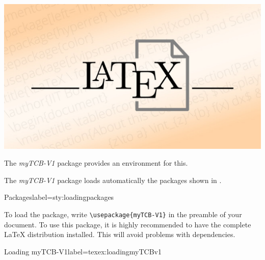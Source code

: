 \documentclass[]{myHOWTO-V001}
\begin{document}
\begin{myBOX}{}

\setlength{\parskip}{3mm}

\lipsum[4]

\qquad
\begin{myFIG}{}
	\includegraphics[scale=0.15]{LaTeX.jpg}
\end{myFIG}

\lipsum[1]

\end{myBOX}

The \emph{myTCB-V1} package provides an environment for this.

\newpage

The \emph{myTCB-V1} package loads automatically the packages shown in .

\begin{mySTYdoclst}{Packages}{label={sty:loadingpackages}}
\RequirePackage{lipsum}

\RequirePackage{graphicx}
\RequirePackage{wrapfig}

\RequirePackage{xcolor}

\RequirePackage{verbatim}
\RequirePackage{fancyvrb}
\RequirePackage{listings}

\RequirePackage{float}

\RequirePackage{refstyle}

\RequirePackage{tcolorbox}
\end{mySTYdoclst}

To load the package, write \Verb|\usepackage{myTCB-V1}| in the preamble of your document. To use this package, it is highly recommended to have the complete \LaTeX{} distribution installed. This will avoid problems with dependencies.

\begin{myTEXEXdoclst}{Loading myTCB-V1}{label={texex:loadingmyTCBv1}}
\usepackage{myTCB-V1}
\end{myTEXEXdoclst}
	
\end{document}
